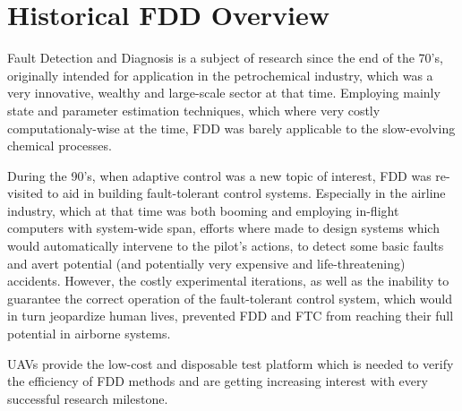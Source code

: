 \chapter{Historical FDD Overview}

Fault Detection and Diagnosis is a subject of research since the end of the 70's, originally intended for application in the petrochemical industry, which was a very innovative, wealthy and large-scale sector at that time. Employing mainly state and parameter estimation techniques, which where very costly computationaly-wise at the time, FDD was barely applicable to the slow-evolving chemical processes.

During the 90's, when adaptive control was a new topic of interest, FDD was re-visited to aid in building fault-tolerant control systems. Especially in the airline industry, which at that time was both booming and employing in-flight computers with system-wide span, efforts where made to design systems which would automatically intervene to the pilot's actions, to detect some basic faults and avert potential (and potentially very expensive and life-threatening) accidents. However, the costly experimental iterations, as well as the inability to guarantee the correct operation of the fault-tolerant control system, which would in turn jeopardize human lives, prevented FDD and FTC from reaching their full potential in airborne systems.

UAVs provide the low-cost and disposable test platform which is needed to verify the efficiency of FDD methods and are getting increasing interest with every successful research milestone.